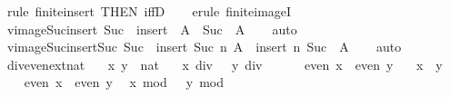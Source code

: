 \begin{isabellebody}
\ {\isacharparenleft}rule\ finite{\isacharunderscore}insert\ {\isacharbrackleft}THEN\ iffD{}{\isacharbrackright}{\isacharparenright}\isanewline
\ \ \isamarkupfalse%
\ {\isacharparenleft}erule\ finite{\isacharunderscore}imageI{\isacharparenright}\isanewline
\ \ \isamarkupfalse%
%
\endisatagproof
{\isafoldproof}%
%
\isadelimproof
\isanewline
%
\endisadelimproof
\isanewline
{}\isamarkupfalse%
\ vimage{\isacharunderscore}Suc{\isacharunderscore}insert{\isacharunderscore}{}{\isacharcolon}\ {\isachardoublequoteopen}Suc\ {\isacharminus}{\isacharbackquote}\ insert\ {}\ A\ {\isacharequal}\ Suc\ {\isacharminus}{\isacharbackquote}\ A{\isachardoublequoteclose}\isanewline
%
\isadelimproof
\ \ %
\endisadelimproof
%
\isatagproof
{}\isamarkupfalse%
\ auto%
\endisatagproof
{\isafoldproof}%
%
\isadelimproof
\isanewline
%
\endisadelimproof
\isanewline
{}\isamarkupfalse%
\ vimage{\isacharunderscore}Suc{\isacharunderscore}insert{\isacharunderscore}Suc{\isacharcolon}\ {\isachardoublequoteopen}Suc\ {\isacharminus}{\isacharbackquote}\ insert\ {\isacharparenleft}Suc\ n{\isacharparenright}\ A\ {\isacharequal}\ insert\ n\ {\isacharparenleft}Suc\ {\isacharminus}{\isacharbackquote}\ A{\isacharparenright}{\isachardoublequoteclose}\isanewline
%
\isadelimproof
\ \ %
\endisadelimproof
%
\isatagproof
{}\isamarkupfalse%
\ auto%
\endisatagproof
{\isafoldproof}%
%
\isadelimproof
\isanewline
%
\endisadelimproof
\isanewline
{}\isamarkupfalse%
\ div{}{\isacharunderscore}even{\isacharunderscore}ext{\isacharunderscore}nat{\isacharcolon}\isanewline
\ \ \ x\ y\ {\isacharcolon}{\isacharcolon}\ nat\isanewline
\ \ \ {\isachardoublequoteopen}x\ div\ {}\ {\isacharequal}\ y\ div\ {}{\isachardoublequoteclose}\isanewline
\ \ \ \ \ {\isachardoublequoteopen}even\ x\ {\isasymlongleftrightarrow}\ even\ y{\isachardoublequoteclose}\isanewline
\ \ \ {\isachardoublequoteopen}x\ {\isacharequal}\ y{\isachardoublequoteclose}\isanewline
%
\isadelimproof
%
\endisadelimproof
%
\isatagproof
{}\isamarkupfalse%
\ {\isacharminus}\isanewline
\ \ \isamarkupfalse%
\ {\isacartoucheopen}even\ x\ {\isasymlongleftrightarrow}\ even\ y{\isacartoucheclose}\ \isamarkupfalse%
\ {\isachardoublequoteopen}x\ mod\ {}\ {\isacharequal}\ y\ mod\ {}{\isachardoublequoteclose}\isanewline
\ \ \ \ \isamarkupfalse%

\end{isabellebody}

